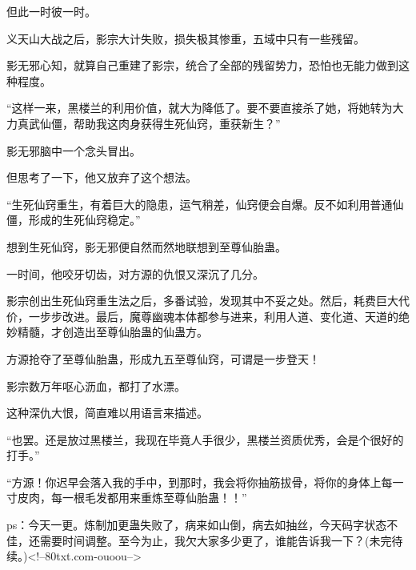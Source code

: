 \begin{this_body}
但此一时彼一时。

义天山大战之后，影宗大计失败，损失极其惨重，五域中只有一些残留。

影无邪心知，就算自己重建了影宗，统合了全部的残留势力，恐怕也无能力做到这种程度。

“这样一来，黑楼兰的利用价值，就大为降低了。要不要直接杀了她，将她转为大力真武仙僵，帮助我这肉身获得生死仙窍，重获新生？”

影无邪脑中一个念头冒出。

但思考了一下，他又放弃了这个想法。

“生死仙窍重生，有着巨大的隐患，运气稍差，仙窍便会自爆。反不如利用普通仙僵，形成的生死仙窍稳定。”

想到生死仙窍，影无邪便自然而然地联想到至尊仙胎蛊。

一时间，他咬牙切齿，对方源的仇恨又深沉了几分。

影宗创出生死仙窍重生法之后，多番试验，发现其中不妥之处。然后，耗费巨大代价，一步步改进。最后，魔尊幽魂本体都参与进来，利用人道、变化道、天道的绝妙精髓，才创造出至尊仙胎蛊的仙蛊方。

方源抢夺了至尊仙胎蛊，形成九五至尊仙窍，可谓是一步登天！

影宗数万年呕心沥血，都打了水漂。

这种深仇大恨，简直难以用语言来描述。

“也罢。还是放过黑楼兰，我现在毕竟人手很少，黑楼兰资质优秀，会是个很好的打手。”

“方源！你迟早会落入我的手中，到那时，我会将你抽筋拔骨，将你的身体上每一寸皮肉，每一根毛发都用来重炼至尊仙胎蛊！！”

ps：今天一更。炼制加更蛊失败了，病来如山倒，病去如抽丝，今天码字状态不佳，还需要时间调整。至今为止，我欠大家多少更了，谁能告诉我一下？(未完待续。)<!--80txt.com-ouoou-->

\end{this_body}

